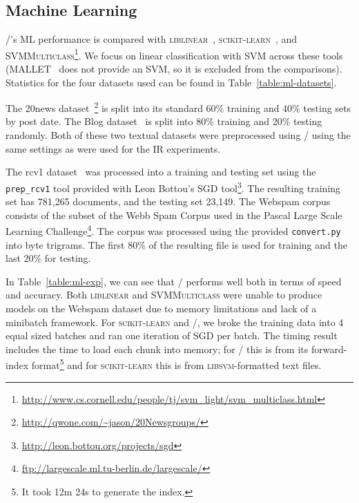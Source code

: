 \subsection{Machine Learning}

\meta/'s ML performance is compared with \textsc{liblinear}~\citep{liblinear},
\textsc{scikit-learn}~\citep{scikit}, and
\textsc{SVMMulticlass}\footnote{\url{http://www.cs.cornell.edu/people/tj/svm_light/svm_multiclass.html}}. We focus on linear classification
with SVM across these tools (MALLET~\citep{mallet} does not provide an SVM, so it
is excluded from the comparisons).
Statistics for the four datasets used can be found in
Table~\ref{table:ml-datasets}.

The 20news
dataset~\citep{Lang:1995:ICML}\footnote{\url{http://qwone.com/~jason/20Newsgroups/}}
is split into its standard 60\% training and 40\% testing sets by post
date. The Blog dataset~\citep{blog} is split into 80\% training and 20\%
testing randomly. Both of these two textual datasets were preprocessed
using \meta/ using the same settings as were used for the IR experiments.

The rcv1 dataset~\citep{rcv1} was processed into a training and testing set
using the \texttt{prep\_rcv1} tool provided with Leon Bottou's SGD
tool\footnote{\url{http://leon.bottou.org/projects/sgd}}. The resulting
training set has 781,265 documents, and the testing set 23,149. The Webspam
corpus~\citep{Webb:2006:CEAS} consists of the subset of the Webb Spam Corpus
used in the Pascal Large Scale Learning
Challenge\footnote{\url{ftp://largescale.ml.tu-berlin.de/largescale/}}.
The corpus was processed using the provided \texttt{convert.py} into byte
trigrams. The first 80\% of the resulting file is used for training and the
last 20\% for testing.

In Table~\ref{table:ml-exp}, we can see that \meta/ performs well both in
terms of speed and accuracy. Both \textsc{liblinear} and
\textsc{SVMMulticlass} were unable to produce models on the Webspam dataset
due to memory limitations and lack of a minibatch framework. For
\textsc{scikit-learn} and \meta/, we broke the training data into 4 equal
sized batches and ran one iteration of SGD per batch. The timing result
includes the time to load each chunk into memory; for \meta/ this is from
its forward-index format\footnote{It took 12m 24s to generate the index.}
and for \textsc{scikit-learn} this is from \textsc{libsvm}-formatted text
files.
